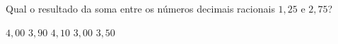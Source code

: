 Qual o resultado da soma entre os números decimais racionais $1{,}25$ e $2{,}75$?

$4{,}00$
$3{,}90$
$4{,}10$
$3{,}00$
$3{,}50$



